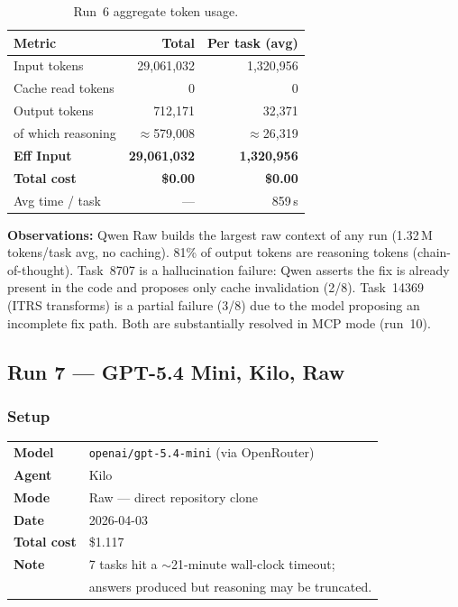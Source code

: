 \begin{table}[h]
\centering
\caption{Run~6 aggregate token usage.}\label{tab:r6-tokens}
\begin{tabular}{lrr}
\toprule
\textbf{Metric} & \textbf{Total} & \textbf{Per task (avg)} \\
\midrule
Input tokens         & 29,061,032 & 1,320,956 \\
Cache read tokens    & 0          & 0 \\
Output tokens        & 712,171    & 32,371    \\
\quad of which reasoning & $\approx$579,008 & $\approx$26,319 \\
\midrule
\textbf{Eff Input}   & \textbf{29,061,032} & \textbf{1,320,956} \\
\textbf{Total cost}  & \textbf{\$0.00}     & \textbf{\$0.00} \\
Avg time / task      & ---         & 859\,s \\
\bottomrule
\end{tabular}
\end{table}

\noindent
\textbf{Observations:} Qwen Raw builds the largest raw context of any run
(1.32\,M tokens/task avg, no caching).
81\% of output tokens are reasoning tokens (chain-of-thought).
Task~8707 is a hallucination failure: Qwen asserts the fix is already present
in the code and proposes only cache invalidation (2/8).
Task~14369 (ITRS transforms) is a partial failure (3/8) due to the model
proposing an incomplete fix path.
Both are substantially resolved in MCP mode (run~10).

\subsection{Run 7 --- GPT-5.4 Mini, Kilo, Raw}
\label{sec:run7}

\subsubsection{Setup}

\begin{tabular}{ll}
\textbf{Model}     & \texttt{openai/gpt-5.4-mini} (via OpenRouter) \\
\textbf{Agent}     & Kilo \\
\textbf{Mode}      & Raw --- direct repository clone \\
\textbf{Date}      & 2026-04-03 \\
\textbf{Total cost} & \$1.117 \\
\textbf{Note}      & 7 tasks hit a $\sim$21-minute wall-clock timeout; \\
                   & answers produced but reasoning may be truncated. \\
\end{tabular}

